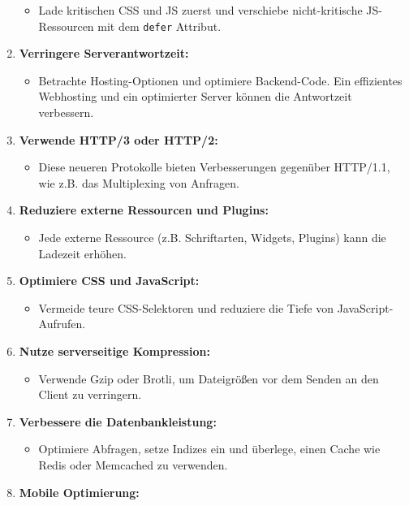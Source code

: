 \documentclass[12pt,a4paper]{scrartcl}
\newcommand{\tightlist}{
  \setlength{\itemsep}{0pt}\setlength{\parskip}{0pt}
}
\begin{document}
\begin{enumerate}
  \begin{itemize}
  \tightlist
  \item
    Lade kritischen CSS und JS zuerst und verschiebe nicht-kritische
    JS-Ressourcen mit dem {\lstinline!defer!} Attribut.
  \end{itemize}
\item
  \textbf{Verringere Serverantwortzeit:}

  \begin{itemize}
  \tightlist
  \item
    Betrachte Hosting-Optionen und optimiere Backend-Code. Ein
    effizientes Webhosting und ein optimierter Server können die
    Antwortzeit verbessern.
  \end{itemize}
\item
  \textbf{Verwende HTTP/3 oder HTTP/2:}

  \begin{itemize}
  \tightlist
  \item
    Diese neueren Protokolle bieten Verbesserungen gegenüber HTTP/1.1,
    wie z.B. das Multiplexing von Anfragen.
  \end{itemize}
\item
  \textbf{Reduziere externe Ressourcen und Plugins:}

  \begin{itemize}
  \tightlist
  \item
    Jede externe Ressource (z.B. Schriftarten, Widgets, Plugins) kann
    die Ladezeit erhöhen.
  \end{itemize}
\item
  \textbf{Optimiere CSS und JavaScript:}

  \begin{itemize}
  \tightlist
  \item
    Vermeide teure CSS-Selektoren und reduziere die Tiefe von
    JavaScript-Aufrufen.
  \end{itemize}
\item
  \textbf{Nutze serverseitige Kompression:}

  \begin{itemize}
  \tightlist
  \item
    Verwende Gzip oder Brotli, um Dateigrößen vor dem Senden an den
    Client zu verringern.
  \end{itemize}
\item
  \textbf{Verbessere die Datenbankleistung:}

  \begin{itemize}
  \tightlist
  \item
    Optimiere Abfragen, setze Indizes ein und überlege, einen Cache wie
    Redis oder Memcached zu verwenden.
  \end{itemize}
\item
  \textbf{Mobile Optimierung:}


\end{enumerate}
\end{document}
